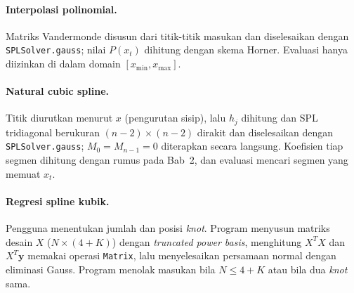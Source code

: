 \documentclass[12pt,a4paper]{article}
\begin{document}
\paragraph{Interpolasi polinomial.} Matriks Vandermonde disusun dari titik-titik masukan dan diselesaikan dengan \texttt{SPLSolver.gauss}; nilai $P(x_t)$ dihitung dengan skema Horner. Evaluasi hanya diizinkan di dalam domain $[x_{\min},x_{\max}]$.

\paragraph{Natural cubic spline.} Titik diurutkan menurut $x$ (pengurutan sisip), lalu $h_j$ dihitung dan SPL tridiagonal berukuran $(n-2)\times(n-2)$ dirakit dan diselesaikan dengan \texttt{SPLSolver.gauss}; $M_0=M_{n-1}=0$ diterapkan secara langsung. Koefisien tiap segmen dihitung dengan rumus pada Bab~2, dan evaluasi mencari segmen yang memuat $x_t$.

\paragraph{Regresi spline kubik.} Pengguna menentukan jumlah dan posisi \textit{knot}. Program menyusun matriks desain $X$ ($N\times(4+K)$) dengan \textit{truncated power basis}, menghitung $X^TX$ dan $X^T\mathbf{y}$ memakai operasi \texttt{Matrix}, lalu menyelesaikan persamaan normal dengan eliminasi Gauss. Program menolak masukan bila $N\le 4+K$ atau bila dua \textit{knot} sama.
\end{document}
